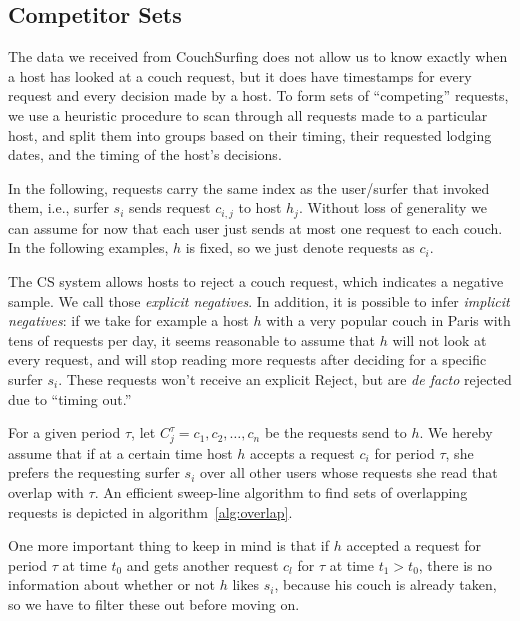 \subsection{Competitor Sets} \label{subsec:competitor_sets}

The data we received from CouchSurfing does not allow us to know exactly when a host has looked at a couch request, but it does have timestamps for every request and every decision made by a host.
To form sets of ``competing'' requests, we use a heuristic procedure to scan through all requests made to a particular host, and split them into groups based on their timing, their requested lodging dates, and the timing of the host's decisions.

In the following, requests carry the same index as the user/surfer that invoked them, i.e., surfer $s_i$ sends request $c_{i,j}$ to host $h_j$.
Without loss of generality we can assume for now that each user just sends at most one request to each couch.
In the following examples, $h$ is fixed, so we just denote requests as $c_i$.
 
The CS system allows hosts to reject a couch request, which indicates a negative sample. We call those \textit{explicit negatives}. In addition, it is possible to infer \textit{implicit negatives}: if we take for example a host $h$ with a very popular couch in Paris with tens of requests per day, it seems reasonable to assume that $h$ will not look at every request, and will stop reading more requests after deciding for a specific surfer $s_i$.
These requests won't receive an explicit Reject, but are \emph{de facto} rejected due to ``timing out.''

For a given period $\tau$, let $C_{j}^{\tau} = c_1, c_2,\ldots,c_n$ be the requests send to $h$. We hereby assume that if at a certain time host $h$ accepts a request $c_i$ for period $\tau$, she prefers the requesting surfer $s_i$ over all other users whose requests she read that overlap with $\tau$. An efficient sweep-line algorithm to find sets of overlapping requests is depicted in {algorithm~\ref{alg:overlap}}.

One more important thing to keep in mind is that if $h$ accepted a request for period $\tau$ at time $t_0$ and gets another request $c_l$ for $\tau$ at time $t_1 > t_0$, there is no information about whether or not $h$ likes $s_i$, because his couch is already taken, so we have to filter these out before moving on.

